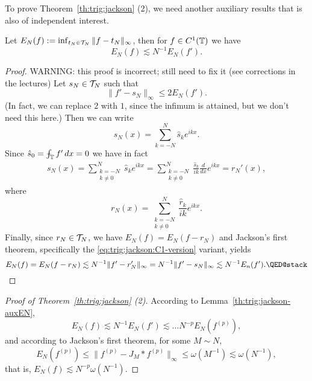 To prove Theorem~\ref{th:trig:jackson} (2), we need another auxiliary
results that is also of independent interest.

\begin{lemma} \label{th:trig:jackson-auxEN}
  Let $E_N(f) := \inf_{t_N \in \mathcal{T}_N} \|f - t_N \|_\infty$, then for
  $f \in C^1(\mathbb{T})$ we have
  \[
    E_N(f) \lesssim N^{-1} E_N(f').
  \]
\end{lemma}
\begin{proof}
  \alert{WARNING: this proof is incorrect; still need to fix it (see
  corrections in the lectures)}
  Let $s_N \in \mathcal{T}_N$ such that
  \[
    \|f' - s_N\|_\infty \leq 2 E_N(f').
  \]
  (In fact, we can replace $2$ with $1$, since the infimum is attained, but
    we don't need this here.) Then we can write
  \[
    s_N(x) = \sum_{k = -N}^N \hat{s}_{k} e^{ikx}.
  \]
  Since $\hat{s}_{0} = \mint_\TT f' \,dx = 0$ we have in fact
  \begin{align*}
    s_N(x)
    =
    \sum_{\substack{k = -N \\ k \neq 0}}^N \hat{s}_{k} e^{ikx}
    =
    \sum_{\substack{k = -N \\ k \neq 0}}^N \frac{\hat{s}_{k}}{ik} \frac{d}{dx} e^{ikx}
    =
    r_N'(x),
  \end{align*}
  where
  \[
    r_N(x) =
    \sum_{\substack{k = -N \\ k \neq 0}}^N \frac{\hat{r}_{k}}{ik} e^{ikx}.
  \]
  Finally, since $r_N \in \mathcal{T}_N$, we have $E_N(f) = E_N(f - r_N)$ and
  Jackson's first theorem, specifically the \eqref{eq:trig:jackson:C1-version}
  variant, yields
  \[
    E_N(f)
    = E_N(f - r_N) \lesssim N^{-1} \| f' - r_N' \|_\infty
    = N^{-1} \| f' - s_N \|_\infty
    \lesssim N^{-1} E_n(f'). \qedhere
  \]
\end{proof}


\begin{proof}[Proof of Theorem~\ref{th:trig:jackson} (2)]
  According to Lemma~\ref{th:trig:jackson-auxEN},
  \[
    E_N(f) \lesssim N^{-1} E_N(f') \lesssim \dots
    N^{-p} E_N(f^{(p)}),
  \]
  and according to Jackson's first theorem, for some $M \sim N$,
  \[
    E_N(f^{(p)}) \leq \| f^{(p)} - J_M \ast f^{(p)} \|_\infty
      \leq \omega(M^{-1}) \lesssim \omega(N^{-1}),
  \]
  that is, $E_N(f) \lesssim N^{-p} \omega(N^{-1})$.
\end{proof}





